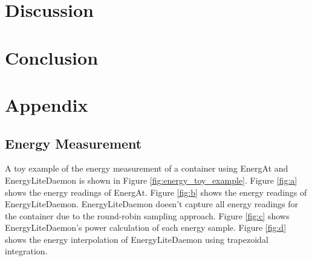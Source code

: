 \documentclass[times, 10pt,twocolumn]{article}
\begin{document}
\section{Discussion}

\section{Conclusion}





\appendix
\section{Appendix}
\subsection{Energy Measurement}
\label{appendix:energy_measurement}
A toy example of the energy measurement of a container using EnergAt and EnergyLiteDaemon is shown in Figure \ref{fig:energy_toy_example}. Figure \ref{fig:a} shows the energy readings of EnergAt. Figure \ref{fig:b} shows the energy readings of EnergyLiteDaemon. EnergyLiteDaemon doesn't capture all energy readings for the container due to the round-robin sampling approach. Figure \ref{fig:c} shows EnergyLiteDaemon's power calculation of each energy sample. Figure \ref{fig:d} shows the energy interpolation of EnergyLiteDaemon using trapezoidal integration.
\end{document}
